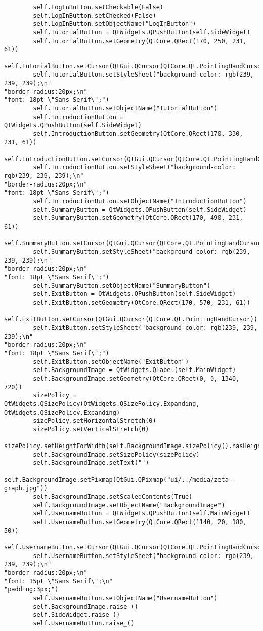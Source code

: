 \documentclass{article}
\begin{document}
\begin{lstlisting}
        self.LogInButton.setCheckable(False)
        self.LogInButton.setChecked(False)
        self.LogInButton.setObjectName("LogInButton")
        self.TutorialButton = QtWidgets.QPushButton(self.SideWidget)
        self.TutorialButton.setGeometry(QtCore.QRect(170, 250, 231, 61))
        self.TutorialButton.setCursor(QtGui.QCursor(QtCore.Qt.PointingHandCursor))
        self.TutorialButton.setStyleSheet("background-color: rgb(239, 239, 239);\n"
"border-radius:20px;\n"
"font: 18pt \"Sans Serif\";")
        self.TutorialButton.setObjectName("TutorialButton")
        self.IntroductionButton = QtWidgets.QPushButton(self.SideWidget)
        self.IntroductionButton.setGeometry(QtCore.QRect(170, 330, 231, 61))
        self.IntroductionButton.setCursor(QtGui.QCursor(QtCore.Qt.PointingHandCursor))
        self.IntroductionButton.setStyleSheet("background-color: rgb(239, 239, 239);\n"
"border-radius:20px;\n"
"font: 18pt \"Sans Serif\";")
        self.IntroductionButton.setObjectName("IntroductionButton")
        self.SummaryButton = QtWidgets.QPushButton(self.SideWidget)
        self.SummaryButton.setGeometry(QtCore.QRect(170, 490, 231, 61))
        self.SummaryButton.setCursor(QtGui.QCursor(QtCore.Qt.PointingHandCursor))
        self.SummaryButton.setStyleSheet("background-color: rgb(239, 239, 239);\n"
"border-radius:20px;\n"
"font: 18pt \"Sans Serif\";")
        self.SummaryButton.setObjectName("SummaryButton")
        self.ExitButton = QtWidgets.QPushButton(self.SideWidget)
        self.ExitButton.setGeometry(QtCore.QRect(170, 570, 231, 61))
        self.ExitButton.setCursor(QtGui.QCursor(QtCore.Qt.PointingHandCursor))
        self.ExitButton.setStyleSheet("background-color: rgb(239, 239, 239);\n"
"border-radius:20px;\n"
"font: 18pt \"Sans Serif\";")
        self.ExitButton.setObjectName("ExitButton")
        self.BackgroundImage = QtWidgets.QLabel(self.MainWidget)
        self.BackgroundImage.setGeometry(QtCore.QRect(0, 0, 1340, 720))
        sizePolicy = QtWidgets.QSizePolicy(QtWidgets.QSizePolicy.Expanding, QtWidgets.QSizePolicy.Expanding)
        sizePolicy.setHorizontalStretch(0)
        sizePolicy.setVerticalStretch(0)
        sizePolicy.setHeightForWidth(self.BackgroundImage.sizePolicy().hasHeightForWidth())
        self.BackgroundImage.setSizePolicy(sizePolicy)
        self.BackgroundImage.setText("")
        self.BackgroundImage.setPixmap(QtGui.QPixmap("ui/../media/zeta-graph.jpg"))
        self.BackgroundImage.setScaledContents(True)
        self.BackgroundImage.setObjectName("BackgroundImage")
        self.UsernameButton = QtWidgets.QPushButton(self.MainWidget)
        self.UsernameButton.setGeometry(QtCore.QRect(1140, 20, 180, 50))
        self.UsernameButton.setCursor(QtGui.QCursor(QtCore.Qt.PointingHandCursor))
        self.UsernameButton.setStyleSheet("background-color: rgb(239, 239, 239);\n"
"border-radius:20px;\n"
"font: 15pt \"Sans Serif\";\n"
"padding:3px;")
        self.UsernameButton.setObjectName("UsernameButton")
        self.BackgroundImage.raise_()
        self.SideWidget.raise_()
        self.UsernameButton.raise_()


\end{lstlisting}
\end{document}
